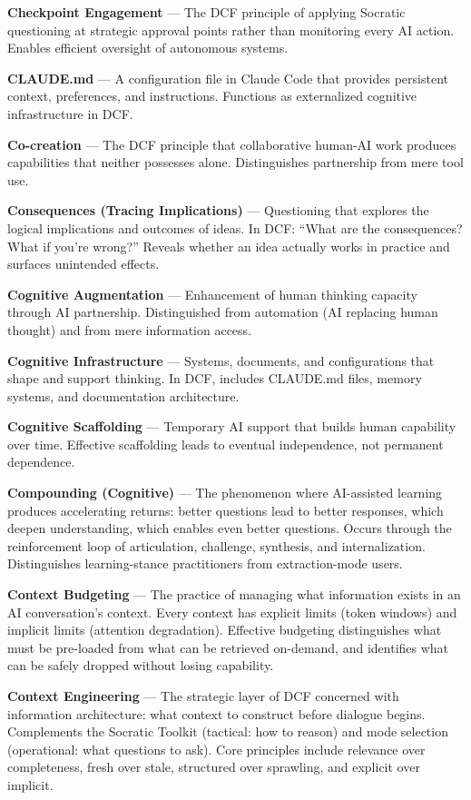 \textbf{Checkpoint Engagement} --- The DCF principle of applying Socratic questioning at strategic approval points rather than monitoring every AI action. Enables efficient oversight of autonomous systems.

\textbf{CLAUDE.md} --- A configuration file in Claude Code that provides persistent context, preferences, and instructions. Functions as externalized cognitive infrastructure in DCF.

\textbf{Co-creation} --- The DCF principle that collaborative human-AI work produces capabilities that neither possesses alone. Distinguishes partnership from mere tool use.

\textbf{Consequences (Tracing Implications)} --- Questioning that explores the logical implications and outcomes of ideas. In DCF: ``What are the consequences? What if you're wrong?'' Reveals whether an idea actually works in practice and surfaces unintended effects.

\textbf{Cognitive Augmentation} --- Enhancement of human thinking capacity through AI partnership. Distinguished from automation (AI replacing human thought) and from mere information access.

\textbf{Cognitive Infrastructure} --- Systems, documents, and configurations that shape and support thinking. In DCF, includes CLAUDE.md files, memory systems, and documentation architecture.

\textbf{Cognitive Scaffolding} --- Temporary AI support that builds human capability over time. Effective scaffolding leads to eventual independence, not permanent dependence.

\textbf{Compounding (Cognitive)} --- The phenomenon where AI-assisted learning produces accelerating returns: better questions lead to better responses, which deepen understanding, which enables even better questions. Occurs through the reinforcement loop of articulation, challenge, synthesis, and internalization. Distinguishes learning-stance practitioners from extraction-mode users.

\textbf{Context Budgeting} --- The practice of managing what information exists in an AI conversation's context. Every context has explicit limits (token windows) and implicit limits (attention degradation). Effective budgeting distinguishes what must be pre-loaded from what can be retrieved on-demand, and identifies what can be safely dropped without losing capability.

\textbf{Context Engineering} --- The strategic layer of DCF concerned with information architecture: what context to construct before dialogue begins. Complements the Socratic Toolkit (tactical: how to reason) and mode selection (operational: what questions to ask). Core principles include relevance over completeness, fresh over stale, structured over sprawling, and explicit over implicit.

